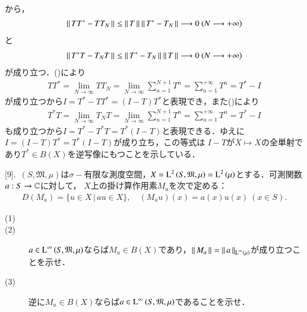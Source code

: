 \begin{prf}
\begin{description}
\begin{align}
		\end{align}
		から，
		\begin{align}
			\left\|\, TT^* - TT_N\, \right\|_{} \leq \left\|\, T\, \right\|_{}\left\|\, T^* - T_N\, \right\|_{} \longrightarrow 0\ (N \longrightarrow +\infty) \label{eq:func_analy_conv1}
		\end{align}
		と
		\begin{align}
			\left\|\, T^*T - T_NT\, \right\|_{} \leq \left\|\, T^* - T_N\, \right\|_{}\left\|\, T\, \right\|_{} \longrightarrow 0\ (N \longrightarrow +\infty) \label{eq:func_analy_conv2}
		\end{align}
		が成り立つ．()により
		\begin{align}
			TT^* = \lim_{N \to \infty} TT_N = \lim_{N \to \infty} \sum_{n=1}^{N+1} T^n = \sum_{n=1}^{+\infty} T^n = T^* - I
		\end{align}
		が成り立つから$I = T^* - TT^* = (I - T)T^*$と表現でき，また()により
		\begin{align}
			T^*T = \lim_{N \to \infty} T_NT = \lim_{N \to \infty} \sum_{n=1}^{N+1} T^n = \sum_{n=1}^{+\infty} T^n = T^* - I
		\end{align}
		も成り立つから$I = T^* - T^*T = T^*(I - T)$と表現できる．ゆえに$I = (I - T)T^* = T^*(I - T)$が成り立ち，この等式は
		$I-T$が$X \longmapsto X$の全単射であり$T^* \in B(X)$を逆写像にもつことを示している．
		\QED
\end{description}
\end{prf}


[9].\ $(S, \mathfrak{M}, \mu)$は$\sigma-$有限な測度空間，$X=\operatorname{L}^{2} \left(S, \mathfrak{M}, \mu\right)=\operatorname{L}^{2} \left(\mu\right)$とする．可測関数$a:S \rightarrow \mathbb{C}$に対して，
$X$上の掛け算作用素$M_a$を次で定める：
\begin{align}
	D(M_a) = \{u \in X\, |\, au \in X\}, \quad (M_au)(x) = a(x)u(x)\ (x \in S).
\end{align}
\begin{description}
	\item[(1)]
	\item[(2)] $a \in \operatorname{L}^{\infty} \left(S, \mathfrak{M}, \mu\right)$ならば$M_a \in B(X)$であり，$\left\|\, M_a\, \right\|_{} = \left\|\, a\, \right\|_{\operatorname{L}^{\infty} \left(\mu\right)}$が成り立つことを示せ．
	\item[(3)] 逆に$M_a \in B(X)$ならば$a \in \operatorname{L}^{\infty} \left(S, \mathfrak{M}, \mu\right)$であることを示せ．
\end{description}

